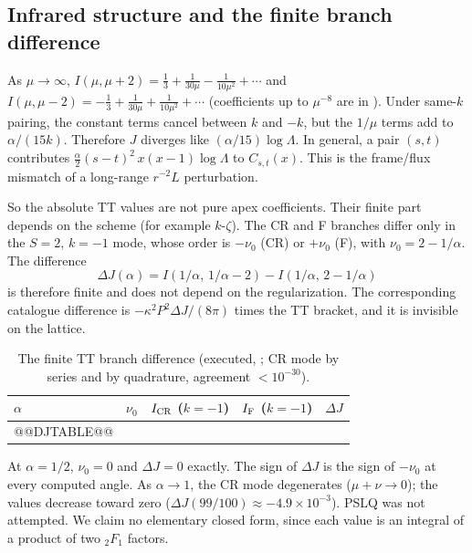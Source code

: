 \subsection{Infrared structure and the finite branch difference}

\begin{proposition}
\label{prop:v9log}
As \(\mu\to\infty\),
\(I(\mu,\mu+2)=\tfrac13+\tfrac1{30\mu}-\tfrac1{10\mu^2}+\cdots\) and
\(I(\mu,\mu-2)=-\tfrac13+\tfrac1{30\mu}+\tfrac1{10\mu^2}+\cdots\)
(coefficients up to \(\mu^{-8}\) are in ).
Under same-\(k\) pairing, the constant terms cancel between \(k\)
and \(-k\), but the \(1/\mu\) terms add to \(\alpha/(15k)\).
Therefore \(J\) diverges like \((\alpha/15)\log\Lambda\). In
general, a pair \((s,t)\) contributes
\(\tfrac{\alpha}{2}(s-t)^2\,x(x-1)\log\Lambda\) to \(C_{s,t}(x)\).
This is the frame/flux mismatch of a long-range \(r^{-2}L\)
perturbation.
\end{proposition}

So the absolute TT values are not pure apex coefficients. Their
finite part depends on the scheme (for example \(k\)-\(\zeta\)).
The CR and F branches differ only in the \(S=2\), \(k=-1\) mode,
whose order is \(-\nu_0\) (CR) or \(+\nu_0\) (F), with
\(\nu_0=2-1/\alpha\). The difference
\[
 \Delta J(\alpha)=I(1/\alpha,\,1/\alpha-2)-I(1/\alpha,\,2-1/\alpha)
\]
is therefore finite and does not depend on the regularization.
The corresponding catalogue difference is
\(-\kappa^2P^2\Delta J/(8\pi)\) times the TT bracket, and it is
invisible on the lattice.

\begin{center}
\scriptsize
\begin{longtable}{@{}lllll@{}}
\caption{The finite TT branch difference (executed, ; CR mode by series and by quadrature, agreement \(<10^{-30}\)).}\label{tab:v9dJ}\\
\toprule
\(\alpha\) & \(\nu_0\) & \(I_{\rm CR}\) (\(k=-1\)) & \(I_{\rm F}\) (\(k=-1\)) & \(\Delta J\)\\
\midrule
@@DJTABLE@@
\bottomrule
\end{longtable}
\end{center}
At \(\alpha=1/2\), \(\nu_0=0\) and \(\Delta J=0\) exactly. The sign
of \(\Delta J\) is the sign of \(-\nu_0\) at every computed angle.
As \(\alpha\to1\), the CR mode degenerates (\(\mu+\nu\to0\)); the
values decrease toward zero (\(\Delta J(99/100)\approx-4.9\times10^{-3}\)).
PSLQ was not attempted. We claim no elementary
closed form, since each value is an integral of a product of two
\({}_2F_1\) factors.

